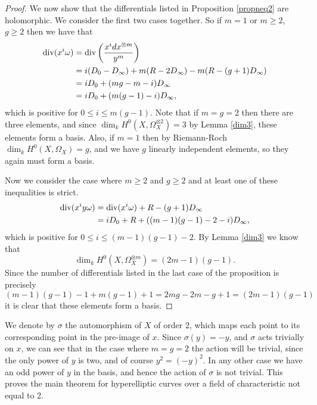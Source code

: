 \begin{proof}
We now show that the differentials listed in Proposition \ref{propneq2} are holomorphic.
We consider the first two cases together.
So if $m=1$ or $m\geq 2$, $g\geq 2$ then we have that
\begin{align*}
\operatorname{div}(x^i\omega) & =  \operatorname{div} \left( \frac{x^idx^{\otimes m}}{y^m} \right)\\ 
& =  i(D_0 -D_\infty) + m(R-2D_\infty) -m(R-(g+1)D_\infty) \\
& =  iD_0 + (mg -m -i)D_\infty \\
& =  iD_0 + (m(g-1) -i)D_\infty,
\end{align*}
which is positive for $0\leq i \leq m(g-1)$.
Note that if $m=g=2$ then there are three elements, and since $\dim_kH^0(X,\Omega_X^{\otimes 2})=3$ by Lemma \ref{dim3}, these elements form a basis.
Also, if $m=1$ then by Riemann-Roch $\dim_k H^0(X,\Omega_X)=g$, and we have $g$ linearly independent elements, so they again must form a basis.

\begin{comment}
If $m=g=2$ then we have that
\begin{align*}
\di\left(\frac{x^idx^{\otimes 2}}{y^2}\right) & =  i(D_0-D_\infty) + 2(R-2D_\infty) - 2(R-(g+1)D_\infty) \\
& =  iD_0+ ((2g-2)-i)D_\infty \\
& =  iD_0 +(2-i)D_\infty,
\end{align*}
which is positive for $0\leq 2$.
By Lemma \ref{dim3} then $\dim_kH^0(X,\Omega_X^{\otimes 2})=3$, so again, we have three linearly independent elements, so they must form a basis.
\end{comment}


Now we consider the case where $m\geq 2$ and $g \geq 2$ and at least one of these inequalities is strict.
\begin{align*}
\operatorname{div} (x^iy\omega) & =  \operatorname{div}(x^i\omega) + R -(g+1)D_\infty \\
& =  iD_0 + R +((m-1)(g-1)-2-i)D_\infty,
\end{align*}
which is positive for $0\leq i \leq (m-1)(g-1)-2$.
By Lemma \ref{dim3} we know that 
\[
\dim_kH^0(X,\Omega_X^{\otimes m}) = (2m-1)(g-1).
\]
Since the number of differentials listed in the last case of the proposition is precisely
\[
(m-1)(g-1)-1 + m(g-1) +1 = 2mg -2m -g + 1 = (2m-1)(g-1)
\]
it is clear that these elements form a basis.
\end{proof}

We denote by $\sigma$ the automorphism of $X$ of order 2, which maps each point to its corresponding point in the pre-image of $x$.
Since $\sigma(y) = -y$, and $\sigma$ acts trivially on $x$, we can see that in the case where $m=g=2$ the action will be trivial, since the only power of $y$ is two, and of course $y^2 = (-y)^2$.
In any other case we have an odd power of $y$ in the basis, and hence the action of $\sigma$ is not trivial.
This proves the main theorem for hyperelliptic curves over a field of characteristic not equal to 2.




